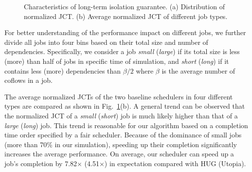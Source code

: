 \documentclass[10pt, conference, letterpaper]{IEEEtran}
\begin{document}
\begin{figure}[!t]
	\centering
	\hfil
	\caption{Characteristics of long-term isolation guarantee. (a) Distribution of normalized JCT. (b) Average normalized JCT of different job types.}
	\label{f1}
\end{figure}

For better understanding of the performance impact on different jobs, we further divide all jobs into four bins based on their total size and number of dependencies. Specifically, we consider a job \emph{small} (\emph{large}) if its total size is less (more) than half of jobs in specific time of simulation, and \emph{short} (\emph{long}) if it contains less (more) dependencies than $\beta/2$ where $\beta$ is the average number of coflows in a job.

The average normalized JCTs of the two baseline schedulers in four different types are compared as shown in Fig.~\ref{f1}(b). A general trend can be observed that the normalized JCT of a \emph{small} (\emph{short}) job is much likely higher than that of a \emph{large} (\emph{long}) job. This trend is reasonable for our algorithm based on a completion time order specified by a fair scheduler. Because of the dominance of small jobs (more than 70\% in our simulation), speeding up their completion significantly increases the average performance. On average, our scheduler can speed up a job's completion by 7.82$\times$ (4.51$\times$) in expectation compared with HUG (Utopia).
\end{document}
